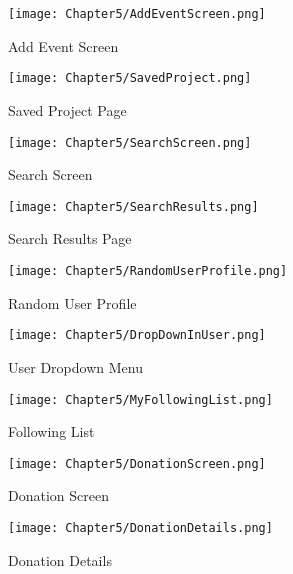 \documentclass[12pt, a4paper]{report}
\begin{document}
\begin{figure}[htbp]
    \centering
    \begin{minipage}[b]{0.35\linewidth}
        \centering
        \texttt{[image: Chapter5/AddEventScreen.png]}
        \caption{Add Event Screen}
        \label{fig:add-event}
    \end{minipage}
    \hfill
    \begin{minipage}[b]{0.35\linewidth}
        \centering
        \texttt{[image: Chapter5/SavedProject.png]}
        \caption{Saved Project Page}
        \label{fig:saved-project}
    \end{minipage}
    \hfill
    \begin{minipage}[b]{0.35\linewidth}
        \centering
        \texttt{[image: Chapter5/SearchScreen.png]}
        \caption{Search Screen}
        \label{fig:search-screen}
    \end{minipage}
    \hfill
    \begin{minipage}[b]{0.35\linewidth}
        \centering
        \texttt{[image: Chapter5/SearchResults.png]}
        \caption{Search Results Page}
        \label{fig:search-results}
    \end{minipage}
\end{figure}

\begin{figure}[htbp]
    \centering
    \begin{minipage}[b]{0.35\linewidth}
        \centering
        \texttt{[image: Chapter5/RandomUserProfile.png]}
        \caption{Random User Profile}
        \label{fig:random-profile}
    \end{minipage}
    \hfill
    \begin{minipage}[b]{0.35\linewidth}
        \centering
        \texttt{[image: Chapter5/DropDownInUser.png]}
        \caption{User Dropdown Menu}
        \label{fig:user-dropdown}
    \end{minipage}
    \hfill
    \begin{minipage}[b]{0.35\linewidth}
        \centering
        \texttt{[image: Chapter5/MyFollowingList.png]}
        \caption{Following List}
        \label{fig:following-list}
    \end{minipage}
\end{figure}

\begin{figure}[htbp]
    \centering
    \begin{minipage}[b]{0.35\linewidth}
        \centering
        \texttt{[image: Chapter5/DonationScreen.png]}
        \caption{Donation Screen}
        \label{fig:donation-screen}
    \end{minipage}
    \hfill
    \begin{minipage}[b]{0.35\linewidth}
        \centering
        \texttt{[image: Chapter5/DonationDetails.png]}
        \caption{Donation Details}
        \label{fig:donation-details}
    \end{minipage}
\end{figure}
\newpage
\end{document}
